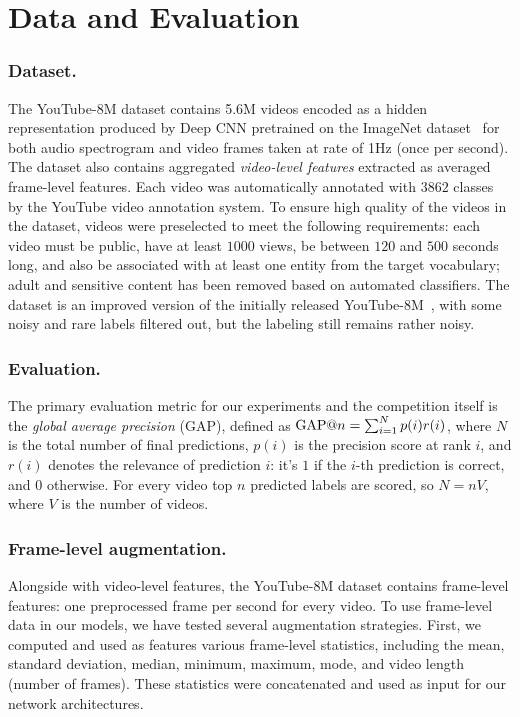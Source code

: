 \documentclass[runningheads]{llncs}
\begin{document}
\section{Data and Evaluation}\label{sec:data}

\subsubsection*{Dataset.}
The YouTube-8M dataset contains 5.6M videos encoded as a hidden representation produced by Deep CNN pretrained on the ImageNet dataset~\cite{imagenet_cvpr09} for both audio spectrogram and video frames taken at rate of 1Hz (once per second). The dataset also contains aggregated \emph{video-level features} extracted as averaged frame-level features. Each video was automatically annotated with $3862$ classes by the YouTube video annotation system. To ensure high quality of the videos in the dataset, videos were preselected to meet the following requirements: each video must be public, have at least $1000$ views, be between $120$ and $500$ seconds long, and also be associated with at least one entity from the target vocabulary; adult and sensitive content has been removed based on automated classifiers. The dataset is an improved version of the initially released YouTube-8M~\cite{DBLP:journals/corr/Abu-El-HaijaKLN16}, with some noisy and rare labels filtered out, but the labeling still remains rather noisy.

\subsubsection*{Evaluation.}
The primary evaluation metric for our experiments and the competition itself is the \emph{global average precision} (GAP), defined as $\mathrm{GAP@}{n} = \sum_{i=1}^N p(i) r(i)$, where $N$ is the total number of final predictions, $p(i)$ is the precision score at rank $i$, and $r(i)$ denotes the relevance of prediction $i$: it’s $1$ if the $i$-th prediction is correct, and $0$ otherwise. For every video top $n$ predicted labels are scored, so $N=nV$, where $V$ is the number of videos.

\subsubsection*{Frame-level augmentation.}
Alongside with video-level features, the YouTube-8M dataset contains frame-level features: one preprocessed frame per second for every video. To use frame-level data in our models, we have tested several augmentation strategies. First, we computed and used as features various frame-level statistics, including the mean, standard deviation, median, minimum, maximum, mode, and video length (number of frames). These statistics were concatenated and used as input for our network architectures.
\end{document}

